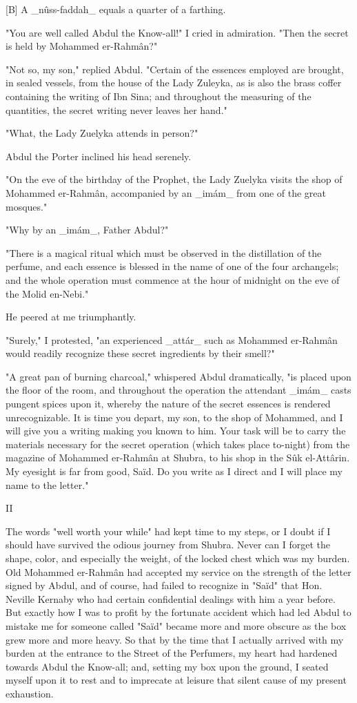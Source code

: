   [B] A _nûss-faddah_ equals a quarter of a farthing.

"You are well called Abdul the Know-all!" I cried in admiration. "Then
the secret is held by Mohammed er-Rahmân?"

"Not so, my son," replied Abdul. "Certain of the essences employed are
brought, in sealed vessels, from the house of the Lady Zuleyka, as is
also the brass coffer containing the writing of Ibn Sina; and
throughout the measuring of the quantities, the secret writing never
leaves her hand."

"What, the Lady Zuelyka attends in person?"

Abdul the Porter inclined his head serenely.

"On the eve of the birthday of the Prophet, the Lady Zuelyka visits
the shop of Mohammed er-Rahmân, accompanied by an _imám_ from one of
the great mosques."

"Why by an _imám_, Father Abdul?"

"There is a magical ritual which must be observed in the distillation
of the perfume, and each essence is blessed in the name of one of the
four archangels; and the whole operation must commence at the hour of
midnight on the eve of the Molid en-Nebi."

He peered at me triumphantly.

"Surely," I protested, "an experienced _attár_ such as Mohammed
er-Rahmân would readily recognize these secret ingredients by their
smell?"

"A great pan of burning charcoal," whispered Abdul dramatically, "is
placed upon the floor of the room, and throughout the operation the
attendant _imám_ casts pungent spices upon it, whereby the nature of
the secret essences is rendered unrecognizable. It is time you depart,
my son, to the shop of Mohammed, and I will give you a writing making
you known to him. Your task will be to carry the materials necessary
for the secret operation (which takes place to-night) from the
magazine of Mohammed er-Rahmân at Shubra, to his shop in the Sûk
el-Attârin. My eyesight is far from good, Saïd. Do you write as I
direct and I will place my name to the letter."


II

The words "well worth your while" had kept time to my steps, or I
doubt if I should have survived the odious journey from Shubra. Never
can I forget the shape, color, and especially the weight, of the
locked chest which was my burden. Old Mohammed er-Rahmân had accepted
my service on the strength of the letter signed by Abdul, and of
course, had failed to recognize in "Saïd" that Hon. Neville Kernaby
who had certain confidential dealings with him a year before. But
exactly how I was to profit by the fortunate accident which had led
Abdul to mistake me for someone called "Saïd" became more and more
obscure as the box grew more and more heavy. So that by the time that
I actually arrived with my burden at the entrance to the Street of the
Perfumers, my heart had hardened towards Abdul the Know-all; and,
setting my box upon the ground, I seated myself upon it to rest and
to imprecate at leisure that silent cause of my present exhaustion.

